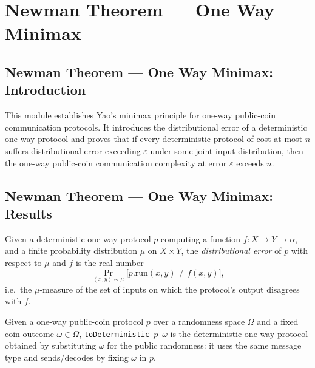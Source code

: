 \section{Newman Theorem --- One Way Minimax}
\subsection*{Newman Theorem --- One Way Minimax: Introduction}

This module establishes Yao's minimax principle for one-way public-coin communication
protocols.  It introduces the distributional error of a deterministic one-way protocol
and proves that if every deterministic protocol of cost at most $n$ suffers distributional
error exceeding $\varepsilon$ under some joint input distribution, then the one-way
public-coin communication complexity at error $\varepsilon$ exceeds $n$.

\subsection*{Newman Theorem --- One Way Minimax: Results}

\begin{definition}
\label{CommunicationComplexity.Deterministic.OneWay.Protocol.distributionalError}
\leanok
{}
Given a deterministic one-way protocol $p$ computing a function
$f : X \to Y \to \alpha$, and a finite probability distribution $\mu$ on $X \times Y$,
the \emph{distributional error} of $p$ with respect to $\mu$ and $f$ is the real number
\[
  \Pr_{(x,y)\sim\mu}\bigl[p.\mathrm{run}(x,y) \neq f(x,y)\bigr],
\]
i.e.\ the $\mu$-measure of the set of inputs on which the protocol's output disagrees
with $f$.
\end{definition}

\begin{definition}
\label{CommunicationComplexity.PublicCoin.OneWay.Protocol.toDeterministic}
\leanok
{}
Given a one-way public-coin protocol $p$ over a randomness space $\Omega$ and a fixed
coin outcome $\omega \in \Omega$, \texttt{toDeterministic}~$p$~$\omega$ is the
deterministic one-way protocol obtained by substituting $\omega$ for the public
randomness: it uses the same message type and sends/decodes by fixing $\omega$ in $p$.
\end{definition}

